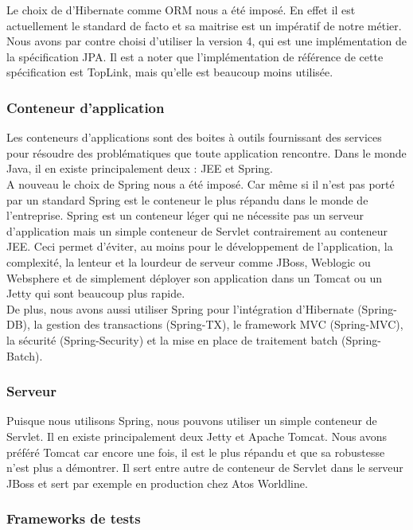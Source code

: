 Le choix de d'Hibernate comme ORM nous a été imposé. En effet il est actuellement le standard de facto et sa maitrise est un impératif de notre métier. Nous avons par contre choisi d'utiliser la version 4, qui est une implémentation de la spécification JPA. Il est a noter que l'implémentation de référence de cette spécification est TopLink, mais qu'elle est beaucoup moins utilisée. 

\subsubsection{Conteneur d'application}

Les conteneurs d'applications sont des boites à outils fournissant des services pour résoudre des problématiques que toute application rencontre. Dans le monde Java, il en existe principalement deux : JEE et Spring.\\

A nouveau le choix de Spring nous a été imposé. Car même si il n'est pas porté par un standard Spring est le conteneur le plus répandu dans le monde de l'entreprise. Spring est un conteneur léger qui ne nécessite pas un serveur d'application mais un simple conteneur de Servlet contrairement au conteneur JEE. Ceci permet d'éviter, au moins pour le développement de l'application, la complexité, la lenteur et la lourdeur de serveur comme JBoss, Weblogic ou Websphere et de simplement déployer son application dans un Tomcat ou un Jetty qui sont beaucoup plus rapide.\\

De plus, nous avons aussi utiliser Spring pour l'intégration d'Hibernate (Spring-DB), la gestion des transactions (Spring-TX), le framework MVC (Spring-MVC), la sécurité (Spring-Security) et la mise en place de traitement batch (Spring-Batch). 

\subsubsection{Serveur}

Puisque nous utilisons Spring, nous pouvons utiliser un simple conteneur de Servlet. Il en existe principalement deux Jetty et Apache Tomcat. Nous avons préféré Tomcat car encore une fois, il est le plus répandu et que sa robustesse n'est plus a démontrer. Il sert entre autre de conteneur de Servlet dans le serveur JBoss et sert par exemple en production chez Atos Worldline. 

\subsubsection{Frameworks de tests}

